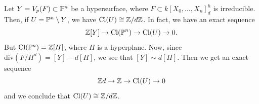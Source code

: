 \begin{example}
    Let $Y=V_p(F)\subset \mathbb{P}^n$ be a hypersurface, where $F\subset k[X_0,\dots, X_n]_d^h$ is irreducible. 
    Then, if $U = \mathbb{P}^n\setminus Y$, we have $\text{Cl}(U) \cong \mathbb{Z}/d\mathbb{Z}$. In fact, we have an exact sequence 
    \begin{equation}
        \mathbb{Z}[Y]\to \text{Cl}(\mathbb{P}^n) \to \text{Cl}(U)\to 0.
    \end{equation}
    But $\text{Cl}(\mathbb{P}^n) = \mathbb{Z}[H]$, where $H$ is a hyperplane. Now, since 
    $\text{div}(F/H^d) = [Y] - d[H]$, we see that $[Y]\sim d[H]$. Then we get an exact sequence 
    \begin{equation}
        \mathbb{Z} d \to \mathbb{Z} \to \text{Cl}(U) \to 0
    \end{equation}
    and we conclude that $\text{Cl}(U)\cong \mathbb{Z}/d\mathbb{Z}$.
\end{example}


